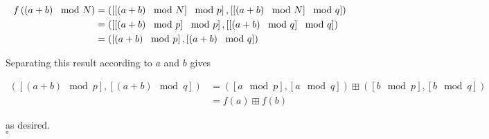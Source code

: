 \documentclass[../CryptoHW3.tex]{subfiles}
\begin{document}
\begin{flushleft}
\begin{align}
  f \left( \left(a + b\right) \mod N \right) &= \left( \left[ \left[ \left(a + b\right) \mod N \right] \mod p \right], \left[ \left[ \left(a + b\right) \mod  N \right] \mod q \right] \right) \notag \\
  &= \left( \left[ \left[ \left(a + b\right) \mod p \right] \mod p \right], \left[ \left[ \left(a + b\right) \mod  q \right] \mod q \right] \right) \notag \\
  &= \left( \left[ \left(a + b\right) \mod p \right], \left[ \left(a + b\right) \mod q \right] \right) \notag
\end{align}

Separating this result according to $a$ and $b$ gives

\begin{align*}
  \left( \left[ \left(a + b\right) \mod p \right], \left[ \left(a + b\right) \mod q \right] \right) &= \left( \left[ a \mod p \right], \left[ a \mod q \right] \right) \boxplus \left( \left[ b \mod p \right], \left[ b \mod q \right] \right) \\
  &= f \left( a \right) \boxplus f \left( b \right)
\end{align*}

as desired. \\
$\square$




\end{flushleft}
\end{document}
